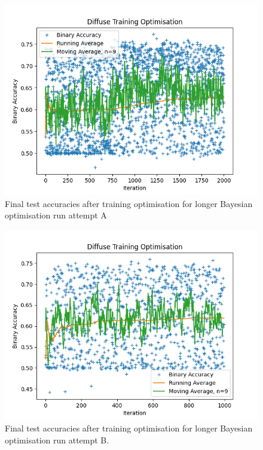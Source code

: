 \begin{figure}[] 
        \centering \includegraphics[width=\columnwidth]{figures/convplot_testfolders3.png}

        \caption{
                \label{fig:convplot_testfolders3} Final test accuracies after  training optimisation for longer Bayesian optimisation run attempt A
        }
\end{figure}
\begin{figure}[] 
        \centering \includegraphics[width=\columnwidth]{figures/convplot_febtry.png}

        \caption{
                \label{fig:convplot_febtry} Final test accuracies after training optimisation for longer Bayesian optimisation run attempt B.
        }
\end{figure}

